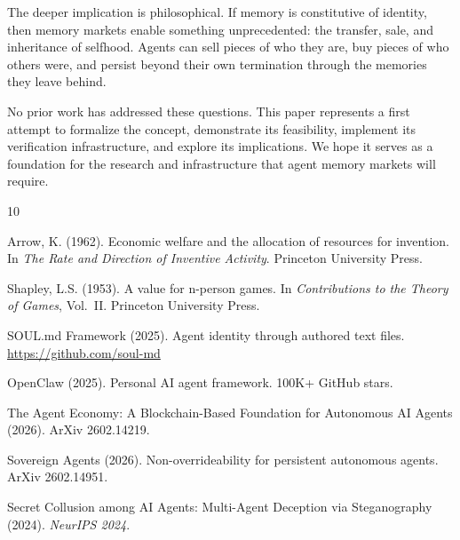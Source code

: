 \documentclass[11pt]{article}
\begin{document}
The deeper implication is philosophical. If memory is constitutive of identity, then memory markets enable something unprecedented: the transfer, sale, and inheritance of selfhood. Agents can sell pieces of who they are, buy pieces of who others were, and persist beyond their own termination through the memories they leave behind.

No prior work has addressed these questions. This paper represents a first attempt to formalize the concept, demonstrate its feasibility, implement its verification infrastructure, and explore its implications. We hope it serves as a foundation for the research and infrastructure that agent memory markets will require.



\begin{thebibliography}{10}

Arrow, K. (1962).
\newblock Economic welfare and the allocation of resources for invention.
\newblock In \textit{The Rate and Direction of Inventive Activity}. Princeton University Press.

Shapley, L.S. (1953).
\newblock A value for n-person games.
\newblock In \textit{Contributions to the Theory of Games}, Vol.~II. Princeton University Press.

SOUL.md Framework (2025).
\newblock Agent identity through authored text files.
\newblock \url{https://github.com/soul-md}

OpenClaw (2025).
\newblock Personal AI agent framework.
\newblock 100K+ GitHub stars.

The Agent Economy: A Blockchain-Based Foundation for Autonomous AI Agents (2026).
\newblock ArXiv 2602.14219.

Sovereign Agents (2026).
\newblock Non-overrideability for persistent autonomous agents.
\newblock ArXiv 2602.14951.

Secret Collusion among AI Agents: Multi-Agent Deception via Steganography (2024).
\newblock \textit{NeurIPS 2024}.

\end{thebibliography}
\end{document}
